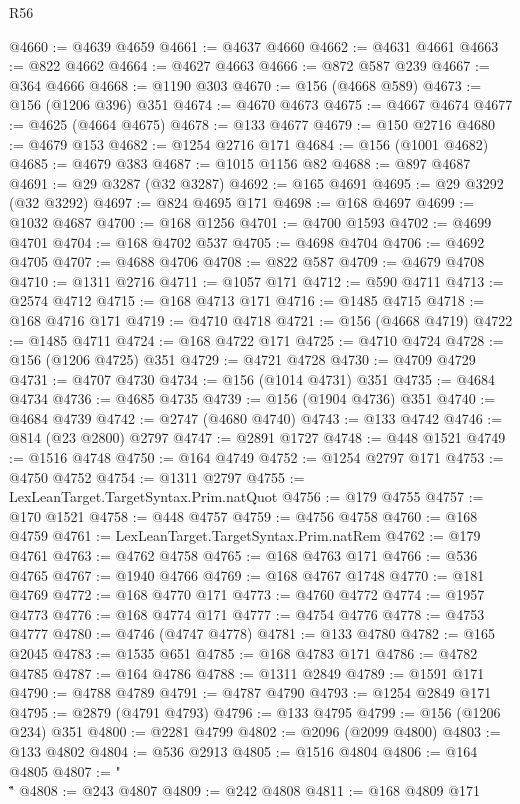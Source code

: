 \begin{lexlean}{R56}
\begin{coremodule}
{{{{{{{{{{{{{{{{{{{{{{{{{{{{{{{{{{{{{{{{{{{{{{{{{{{{{{{{{{{{{{{{{{{{{{{{{{{{{{{{{{{{{{{{{{{{{{{{{{{{{{{{{{{{{{{{{{{{{{{{{{{{{{{{{{{{{{{{{{{{{{{{{{{{{{{{{{{{{{{{{{{{{{{{{{{{{{{{{{{{{{{{{{{{{{{{{{{{{{{{{{{{{{{{{{{@4660 := @4639 @4659
@4661 := @4637 @4660
@4662 := @4631 @4661
@4663 := @822 @4662
@4664 := @4627 @4663
@4666 := @872 @587 @239
@4667 := @364 @4666
@4668 := @1190 @303
@4670 := @156 (@4668 @589)
@4673 := @156 (@1206 @396) @351
@4674 := @4670 @4673
@4675 := @4667 @4674
@4677 := @4625 (@4664 @4675)
@4678 := @133 @4677
@4679 := @150 @2716
@4680 := @4679 @153
@4682 := @1254 @2716 @171
@4684 := @156 (@1001 @4682)
@4685 := @4679 @383
@4687 := @1015 @1156 @82
@4688 := @897 @4687
@4691 := @29 @3287 (@32 @3287)
@4692 := @165 @4691
@4695 := @29 @3292 (@32 @3292)
@4697 := @824 @4695 @171
@4698 := @168 @4697
@4699 := @1032 @4687
@4700 := @168 @1256
@4701 := @4700 @1593
@4702 := @4699 @4701
@4704 := @168 @4702 @537
@4705 := @4698 @4704
@4706 := @4692 @4705
@4707 := @4688 @4706
@4708 := @822 @587
@4709 := @4679 @4708
@4710 := @1311 @2716
@4711 := @1057 @171
@4712 := @590 @4711
@4713 := @2574 @4712
@4715 := @168 @4713 @171
@4716 := @1485 @4715
@4718 := @168 @4716 @171
@4719 := @4710 @4718
@4721 := @156 (@4668 @4719)
@4722 := @1485 @4711
@4724 := @168 @4722 @171
@4725 := @4710 @4724
@4728 := @156 (@1206 @4725) @351
@4729 := @4721 @4728
@4730 := @4709 @4729
@4731 := @4707 @4730
@4734 := @156 (@1014 @4731) @351
@4735 := @4684 @4734
@4736 := @4685 @4735
@4739 := @156 (@1904 @4736) @351
@4740 := @4684 @4739
@4742 := @2747 (@4680 @4740)
@4743 := @133 @4742
@4746 := @814 (@23 @2800) @2797
@4747 := @2891 @1727
@4748 := @448 @1521
@4749 := @1516 @4748
@4750 := @164 @4749
@4752 := @1254 @2797 @171
@4753 := @4750 @4752
@4754 := @1311 @2797
@4755 := LexLeanTarget.TargetSyntax.Prim.natQuot
@4756 := @179 @4755
@4757 := @170 @1521
@4758 := @448 @4757
@4759 := @4756 @4758
@4760 := @168 @4759
@4761 := LexLeanTarget.TargetSyntax.Prim.natRem
@4762 := @179 @4761
@4763 := @4762 @4758
@4765 := @168 @4763 @171
@4766 := @536 @4765
@4767 := @1940 @4766
@4769 := @168 @4767 @1748
@4770 := @181 @4769
@4772 := @168 @4770 @171
@4773 := @4760 @4772
@4774 := @1957 @4773
@4776 := @168 @4774 @171
@4777 := @4754 @4776
@4778 := @4753 @4777
@4780 := @4746 (@4747 @4778)
@4781 := @133 @4780
@4782 := @165 @2045
@4783 := @1535 @651
@4785 := @168 @4783 @171
@4786 := @4782 @4785
@4787 := @164 @4786
@4788 := @1311 @2849
@4789 := @1591 @171
@4790 := @4788 @4789
@4791 := @4787 @4790
@4793 := @1254 @2849 @171
@4795 := @2879 (@4791 @4793)
@4796 := @133 @4795
@4799 := @156 (@1206 @234) @351
@4800 := @2281 @4799
@4802 := @2096 (@2099 @4800)
@4803 := @133 @4802
@4804 := @536 @2913
@4805 := @1516 @4804
@4806 := @164 @4805
@4807 := "\\\""
@4808 := @243 @4807
@4809 := @242 @4808
@4811 := @168 @4809 @171
}}}}}}}}}}}}}}}}}}}}}}}}}}}}}}}}}}}}}}}}}}}}}}}}}}}}}}}}}}}}}}}}}}}}}}}}}}}}}}}}}}}}}}}}}}}}}}}}}}}}}}}}}}}}}}}}}}}}}}}}}}}}}}}}}}}}}}}}}}}}}}}}}}}}}}}}}}}}}}}}}}}}}}}}}}}}}}}}}}}}}}}}}}}}}}}}}}}}}}}}}}}}}}}}}}}
\end{coremodule}
\end{lexlean}
